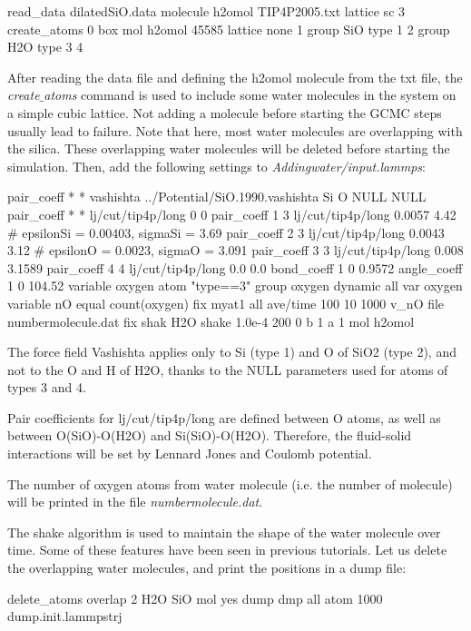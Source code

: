 \begin{lcverbatim}
read_data dilatedSiO.data
molecule h2omol TIP4P2005.txt
lattice sc 3
create_atoms 0 box mol h2omol 45585
lattice none 1
group SiO type 1 2
group H2O type 3 4
\end{lcverbatim}

\noindent After reading the data file and defining the h2omol molecule
from the txt file, the \textit{create$\_$atoms} command is used to
include some water molecules in the system on a 
simple cubic lattice. Not adding a molecule before starting the
GCMC steps usually lead to failure. Note that here,
most water molecules are overlapping with the silica. These 
overlapping water molecules will be deleted before 
starting the simulation. 
Then, add the following settings to \textit{Addingwater/input.lammps}:

\begin{lcverbatim}
pair_coeff * * vashishta ../Potential/SiO.1990.vashishta Si O NULL NULL
pair_coeff * * lj/cut/tip4p/long 0 0
pair_coeff 1 3 lj/cut/tip4p/long 0.0057 4.42 # epsilonSi = 0.00403, sigmaSi = 3.69
pair_coeff 2 3 lj/cut/tip4p/long 0.0043 3.12 # epsilonO = 0.0023, sigmaO = 3.091
pair_coeff 3 3 lj/cut/tip4p/long 0.008 3.1589
pair_coeff 4 4 lj/cut/tip4p/long 0.0 0.0
bond_coeff 1 0 0.9572
angle_coeff 1 0 104.52
variable oxygen atom "type==3"
group oxygen dynamic all var oxygen
variable nO equal count(oxygen)
fix myat1 all ave/time 100 10 1000 v_nO file numbermolecule.dat
fix shak H2O shake 1.0e-4 200 0 b 1 a 1 mol h2omol
\end{lcverbatim}

\noindent The force field Vashishta applies only to Si (type 1) and O of SiO2 (type 2),
and not to the O and H of H2O, thanks to the NULL
parameters used for atoms of types 3 and 4. 

Pair coefficients for lj/cut/tip4p/long are
defined between O atoms, as well as between
O(SiO)-O(H2O) and Si(SiO)-O(H2O). Therefore, the fluid-solid 
interactions will be set by Lennard Jones and Coulomb potential. 

The number of oxygen atoms from water molecule (i.e. the number of molecule)
will be printed in the file \textit{numbermolecule.dat}.

The shake algorithm is used to
maintain the shape of the water molecule over time. Some of
these features have been seen in previous tutorials.
Let us delete the overlapping water molecules, and print the 
positions in a dump file:

\begin{lcverbatim}
delete_atoms overlap 2 H2O SiO mol yes
dump dmp all atom 1000 dump.init.lammpstrj
\end{lcverbatim}

